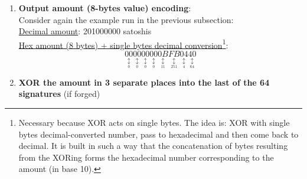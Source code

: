 \documentclass[10.5pt,compress]{beamer}
\def\blegend#1#2{\underset{\underset{\scriptstyle\text{#2}}{\scriptstyle\updownarrow}}{#1}}
\begin{document}
\begin{frame}[allowframebreaks]
\begin{enumerate}
\begin{enumerate}
\begin{itemize}
            \end{itemize}
            \framebreak
            \underline{Sender}:\\
            \begin{equation*}
                \fbox{s_{PUBLISH} = s_{COMMON} \oplus amount}
            \end{equation*}
            \underline{Receiver}:
            \begin{equation*}
                \fbox{s_{COMMON} \oplus s_{PUBLISH} = s_{COMMON} \oplus s_{COMMON} \oplus amount = amount}
            \end{equation*}
            Thus, the receiver, looking at the last (in general) signature and computing $s_{COMMON} \oplus s_{PUBLISH}$ sees:
            \begin{itemize}
                \item \underline{the amount} if the last signature is the one that has been tampered with the amount
                \item \underline{0} if the last signature hasn't been tampered with the amount, while still being forged.
            \end{itemize}
            \framebreak
            \item \textbf{Output amount (8-bytes value) encoding}:\\
            Consider again the example run in the previous subsection:\\
            \underline{Decimal amount}: 201000000 satoshis\\
            \underline{Hex amount (8 bytes) + single bytes decimal conversion}\footnote{\tiny{Necessary because XOR acts on single bytes. The idea is: XOR with single bytes decimal-converted number, pass to hexadecimal and then come back to decimal. It is built in such a way that the concatenation of bytes resulting from the XORing forms the hexadecimal number corresponding to the amount (in base 10).}}:
            \begin{equation*}
                \blegend{00}{0}\blegend{00}{0}\blegend{00}{0}\blegend{00}{0}\blegend{0B}{11}\blegend{FB}{251}\blegend{04}{4}\blegend{40}{64} 
            \end{equation*}
            \item \textbf{XOR the amount in 3 separate places into the last of the 64 signatures} (if forged)

\end{enumerate}
\end{enumerate}
\end{frame}
\end{document}
